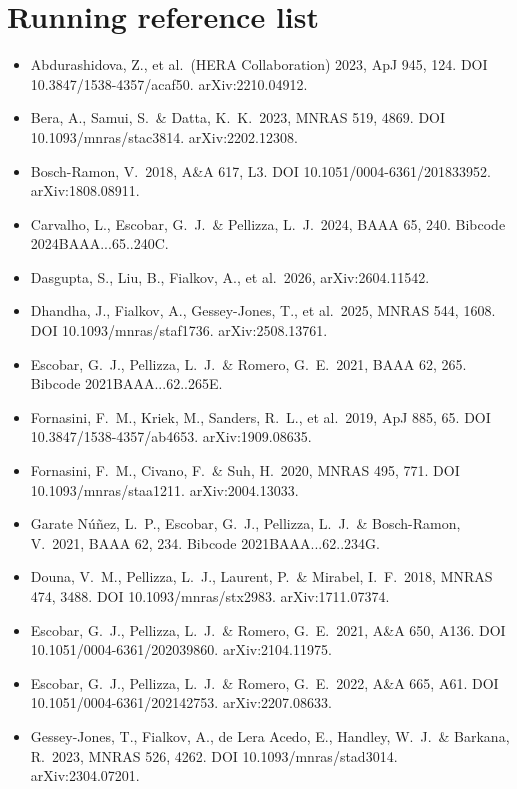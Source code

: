 \documentclass[11pt,a4paper]{article}
\begin{document}
\section*{Running reference list}

\begin{itemize}[leftmargin=*,itemsep=1pt,label={}]\small
\item Abdurashidova, Z., et al.\ (HERA Collaboration) 2023, ApJ 945, 124. DOI 10.3847/1538-4357/acaf50. arXiv:2210.04912.
\item Bera, A., Samui, S.\ \& Datta, K.~K.\ 2023, MNRAS 519, 4869. DOI 10.1093/mnras/stac3814. arXiv:2202.12308.
\item Bosch-Ramon, V.\ 2018, A\&A 617, L3. DOI 10.1051/0004-6361/201833952. arXiv:1808.08911.
\item Carvalho, L., Escobar, G.~J.\ \& Pellizza, L.~J.\ 2024, BAAA 65, 240. Bibcode 2024BAAA...65..240C.
\item Dasgupta, S., Liu, B., Fialkov, A., et al.\ 2026, arXiv:2604.11542.
\item Dhandha, J., Fialkov, A., Gessey-Jones, T., et al.\ 2025, MNRAS 544, 1608. DOI 10.1093/mnras/staf1736. arXiv:2508.13761.
\item Escobar, G.~J., Pellizza, L.~J.\ \& Romero, G.~E.\ 2021, BAAA 62, 265. Bibcode 2021BAAA...62..265E.
\item Fornasini, F.~M., Kriek, M., Sanders, R.~L., et al.\ 2019, ApJ 885, 65. DOI 10.3847/1538-4357/ab4653. arXiv:1909.08635.
\item Fornasini, F.~M., Civano, F.\ \& Suh, H.\ 2020, MNRAS 495, 771. DOI 10.1093/mnras/staa1211. arXiv:2004.13033.
\item Garate N\'u\~nez, L.~P., Escobar, G.~J., Pellizza, L.~J.\ \& Bosch-Ramon, V.\ 2021, BAAA 62, 234. Bibcode 2021BAAA...62..234G.
\item Douna, V.~M., Pellizza, L.~J., Laurent, P.\ \& Mirabel, I.~F.\ 2018, MNRAS 474, 3488. DOI 10.1093/mnras/stx2983. arXiv:1711.07374.
\item Escobar, G.~J., Pellizza, L.~J.\ \& Romero, G.~E.\ 2021, A\&A 650, A136. DOI 10.1051/0004-6361/202039860. arXiv:2104.11975.
\item Escobar, G.~J., Pellizza, L.~J.\ \& Romero, G.~E.\ 2022, A\&A 665, A61. DOI 10.1051/0004-6361/202142753. arXiv:2207.08633.
\item Gessey-Jones, T., Fialkov, A., de Lera Acedo, E., Handley, W.~J.\ \& Barkana, R.\ 2023, MNRAS 526, 4262. DOI 10.1093/mnras/stad3014. arXiv:2304.07201.

\end{itemize}
\end{document}
